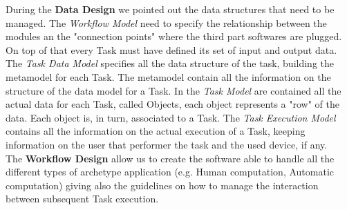 During the \textbf{Data Design} we pointed out the data structures that
need to be managed. The \emph{Workflow Model} need to specify the relationship
between the modules an the "connection points" where the third part softwares
are plugged. On top of that every Task must have defined its set of input and
output data.
The \emph{Task Data Model} specifies all the data structure of the task, building
the metamodel for each Task. The metamodel contain all the information on the 
structure of the data model for a Task.
In the \emph{Task Model} are contained all the actual data for each Task, called
Objects, each object represents a "row" of the data. Each object is, in turn,
associated to a Task.
The \emph{Task Execution Model} contains all the information on the actual
execution of a Task, keeping information on the user that performer the task and
the used device, if any.\\

The \textbf{Workflow Design} allow us to create the software able to handle all
the different types of archetype application (e.g. Human computation, Automatic
computation) giving also the guidelines on how to manage the interaction between
subsequent Task execution.